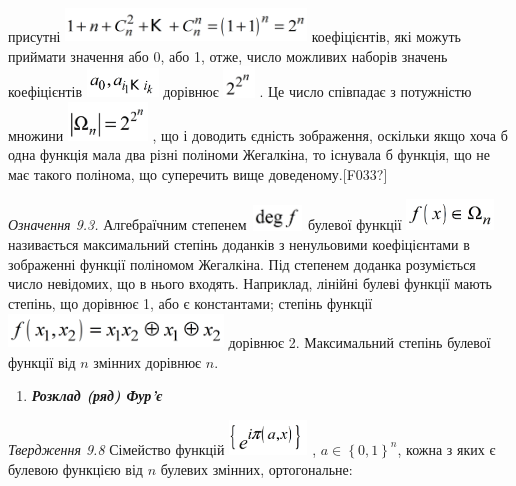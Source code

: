 присутні 
\includegraphics[width=2.5201in,height=0.3646in]{crypt-img/crypt-img123.png} 
коефіцієнтів, які можуть приймати значення або 0, або 1, отже, число можливих
наборів значень коефіцієнтів 
\includegraphics[width=0.7472in,height=0.3071in]{crypt-img/crypt-img124.png} 
дорівнює 
\includegraphics[width=0.3264in,height=0.3264in]{crypt-img/crypt-img125.png} .
Це число співпадає з потужністю множини 
\includegraphics[width=0.8339in,height=0.4016in]{crypt-img/crypt-img126.png} ,
що і доводить єдність зображення, оскільки якщо  хоча б одна функція мала два
різні поліноми Жегалкіна, то існувала б функція, що не має такого полінома, що
суперечить вище доведеному.\textlatin{[F033?]}

\textit{Означення 9.3.} Алгебраїчним степенем 
\includegraphics[width=0.5425in,height=0.2665in]{crypt-img/crypt-img127.png} 
булевої функції 
\includegraphics[width=0.9098in,height=0.3354in]{crypt-img/crypt-img128.png} 
називається максимальний степінь доданків з ненульовими коефіцієнтами в
зображенні функції поліномом Жегалкіна. Під степенем доданка розуміється число
невідомих, що в нього входять. Наприклад, лінійні булеві функції мають степінь,
що дорівнює 1, або є константами; степінь функції 
\includegraphics[width=2.248in,height=0.3583in]{crypt-img/crypt-img129.png}  
дорівнює  2. Максимальний степінь булевої функції від $n$ змінних
дорівнює $n$.


\bigskip

\liststyleWWviiiNumlii
\setcounter{saveenum}{\value{enumi}}
\begin{enumerate}
\setcounter{enumi}{\value{saveenum}}
\item {\bfseries\itshape
Розклад (ряд) Фур’є }
\end{enumerate}
\textit{Твердження 9.8 }Сімейство функцій 
\includegraphics[width=0.8181in,height=0.3661in]{crypt-img/crypt-img130.png} , 
$a\in \left\{0,1\right\}^n$, кожна з яких є  булевою функцією від
$n$ булевих змінних, ортогональне:


